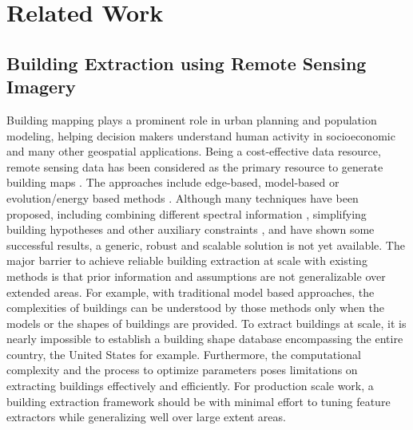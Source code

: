 \documentclass[journal]{IEEEtran}
\begin{document}
\section{Related Work}


\subsection{Building Extraction using Remote Sensing Imagery}
Building mapping plays a prominent role in urban planning and population modeling, helping decision makers understand human activity in socioeconomic \cite{Jensen1999} and many other geospatial applications. Being a cost-effective data resource, remote sensing data has been considered as the primary resource to generate building maps \cite{Ok2013a,Ngo2017,Li2015,Kim1999,Hermosilla2011,Cote2013}. The approaches include edge-based, model-based \cite{Ngo2017} or evolution/energy based methods \cite{Cote2013}. Although many techniques have been proposed, including combining different spectral information \cite{Ok2013a}, simplifying building hypotheses \cite{Kim1999} and other auxiliary constraints \cite{Ngo2017}, and have shown some successful results, a generic, robust and scalable solution is not yet available. The major barrier to achieve reliable building extraction at scale with existing methods is that prior information and assumptions are not generalizable over extended areas. For example, with traditional model based approaches, the complexities of buildings can be understood by those methods only when the models or the shapes of buildings are provided. To extract buildings at scale, it is nearly impossible to establish a building shape database encompassing the entire country, the United States for example. Furthermore, the computational complexity and the process to optimize parameters poses limitations on extracting buildings effectively and efficiently. For production scale work, a building extraction framework should be with minimal effort to tuning feature extractors while generalizing well over large extent areas.
\end{document}
